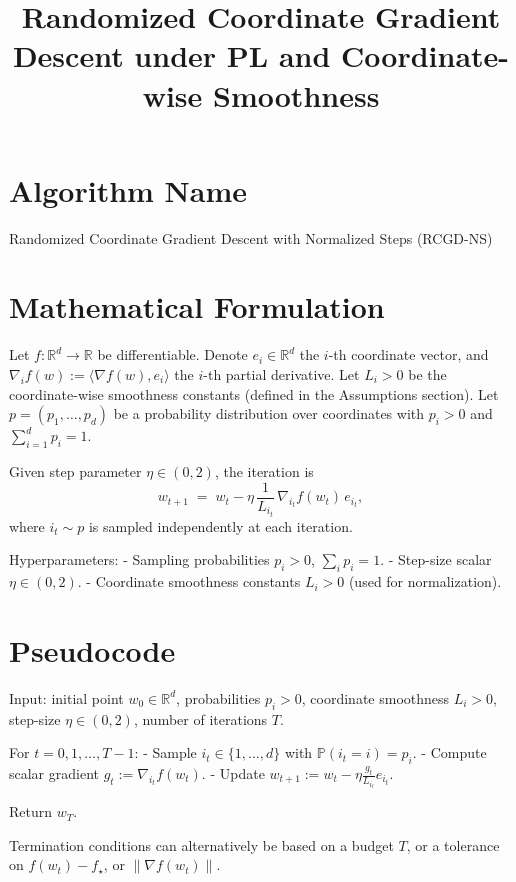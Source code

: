 \documentclass[11pt]{article}
\title{Randomized Coordinate Gradient Descent under PL and Coordinate-wise Smoothness}
\author{}
\date{}
\newcommand{\R}{\mathbb{R}}
\begin{document}
\maketitle

\section*{Algorithm Name}
Randomized Coordinate Gradient Descent with Normalized Steps (RCGD-NS)

\section*{Mathematical Formulation}
Let $f:\R^d\to\R$ be differentiable. Denote $e_i\in\R^d$ the $i$-th coordinate vector, and $\nabla_i f(w) := \langle \nabla f(w), e_i\rangle$ the $i$-th partial derivative. Let $L_i>0$ be the coordinate-wise smoothness constants (defined in the Assumptions section). Let $p=(p_1,\ldots,p_d)$ be a probability distribution over coordinates with $p_i>0$ and $\sum_{i=1}^d p_i=1$.

Given step parameter $\eta\in(0,2)$, the iteration is
\[
w_{t+1} \;=\; w_t - \eta\,\frac{1}{L_{i_t}}\,\nabla_{i_t} f(w_t)\, e_{i_t},
\]
where $i_t\sim p$ is sampled independently at each iteration.

Hyperparameters:
- Sampling probabilities $p_i>0$, $\sum_i p_i=1$.
- Step-size scalar $\eta\in(0,2)$.
- Coordinate smoothness constants $L_i>0$ (used for normalization).

\section*{Pseudocode}
Input: initial point $w_0\in\R^d$, probabilities $p_i>0$, coordinate smoothness $L_i>0$, step-size $\eta\in(0,2)$, number of iterations $T$.

For $t=0,1,\dots,T-1$:
- Sample $i_t\in\{1,\dots,d\}$ with $\mathbb{P}(i_t=i)=p_i$.
- Compute scalar gradient $g_t := \nabla_{i_t} f(w_t)$.
- Update $w_{t+1} := w_t - \eta \frac{g_t}{L_{i_t}} e_{i_t}$.

Return $w_T$.

Termination conditions can alternatively be based on a budget $T$, or a tolerance on $f(w_t)-f_\star$, or $\|\nabla f(w_t)\|$.
\end{document}
